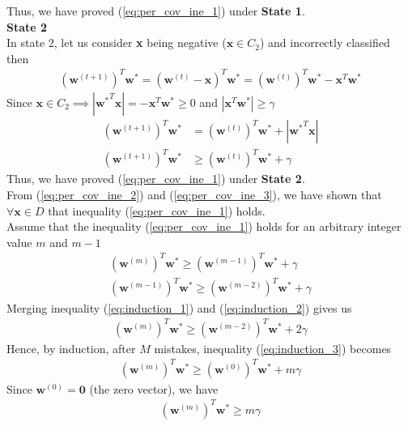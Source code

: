 Thus, we have proved (\ref{eq:per_cov_ine_1})  under \textbf{State 1}.\\
\indent \textbf{State 2} \\
In state 2, let us consider \textbf{x} being negative ($\textbf{x} \in C_2$) and incorrectly classified then
\begin{align}
  \nonumber
  (\textbf{w}^ {(t+1)})^T\textbf{w}^{*} = (\textbf{w}^ {(t)} - \textbf{x})^T\textbf{w}^{*} =   (\textbf{w}^ {(t)})^T\textbf{w}^{*} - \textbf{x}^T\textbf{w}^{*}
\end{align}
Since $\textbf{x} \in C_2 \implies |{\textbf{w}^*}^T\textbf{x}| = - \textbf{x}^T\textbf{w}^* \geq 0$ and $|\textbf{x}^T\textbf{w}^{*}| \geq \gamma$
\begin{align}
  \nonumber
  (\textbf{w}^ {(t+1)})^T\textbf{w}^{*} &= (\textbf{w}^ {(t)})^T\textbf{w}^{*} + |{\textbf{w}^*}^T\textbf{x}| \\
  \label{eq:per_cov_ine_3}
  (\textbf{w}^ {(t+1)})^T\textbf{w}^{*} &\geq (\textbf{w}^ {(t)})^T\textbf{w}^{*} + \gamma
\end{align}
Thus, we have proved (\ref{eq:per_cov_ine_1})  under \textbf{State 2}.\\
From (\ref{eq:per_cov_ine_2}) and (\ref{eq:per_cov_ine_3}), we have shown that $\forall \textbf{x}\in D$ that inequality (\ref{eq:per_cov_ine_1}) holds.\\
Assume that the inequality (\ref{eq:per_cov_ine_1}) holds for an arbitrary integer value $m$ and $m-1$
\begin{align}
  \label{eq:induction_1}
  (\textbf{w}^ {(m)})^T\textbf{w}^{*} \geq (\textbf{w}^ {(m-1)})^T\textbf{w}^{*} + \gamma \\
  \label{eq:induction_2}
  (\textbf{w}^ {(m-1)})^T\textbf{w}^{*} \geq (\textbf{w}^ {(m-2)})^T\textbf{w}^{*} + \gamma 
\end{align}
Merging inequality (\ref{eq:induction_1}) and (\ref{eq:induction_2}) gives us
\begin{align}
  \label{eq:induction_3}
  (\textbf{w}^ {(m)})^T\textbf{w}^{*} \geq (\textbf{w}^ {(m-2)})^T\textbf{w}^{*} + 2\gamma
\end{align}
Hence, by induction, after $M$ mistakes, inequality (\ref{eq:induction_3}) becomes
\begin{align}
  \label{eq:induction_starts}
  (\textbf{w}^ {(m)})^T\textbf{w}^{*} \geq (\textbf{w}^ {(0)})^T\textbf{w}^{*} + m\gamma
\end{align}
Since $\textbf{w}^{(0)} = \mathbf{0}$ (the zero vector), we have
\begin{align}
  \label{eq:perp_cov_result1}
  (\textbf{w}^ {(m)})^T\textbf{w}^{*} \geq m\gamma
\end{align}
